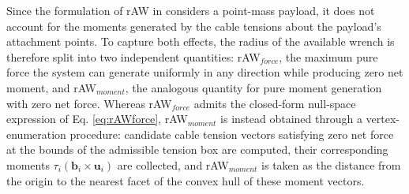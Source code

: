 Since the formulation of rAW in \cite{jamshidifar_static_2020} considers a point-mass payload, it does not account for the moments generated by the cable tensions about the payload's attachment points. To capture both effects, the radius of the available wrench is therefore split into two independent quantities: rAW$_{force}$, the maximum pure force the system can generate uniformly in any direction while producing zero net moment, and rAW$_{moment}$, the analogous quantity for pure moment generation with zero net force. Whereas rAW$_{force}$ admits the closed-form null-space expression of Eq. \ref{eq:rAWforce}, rAW$_{moment}$ is instead obtained through a vertex-enumeration procedure: candidate cable tension vectors satisfying zero net force at the bounds of the admissible tension box are computed, their corresponding moments $\tau_i (\mathbf{b}_i \times \mathbf{u}_i)$ are collected, and rAW$_{moment}$ is taken as the distance from the origin to the nearest facet of the convex hull of these moment vectors.





